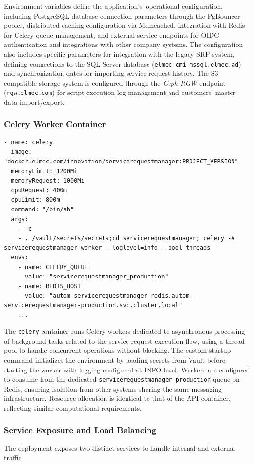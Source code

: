 Environment variables define the application's~operational configuration, including PostgreSQL database connection parameters through the PgBouncer pooler, distributed caching configuration via Memcached, integration with Redis for Celery queue management, and external service endpoints for OIDC authentication and integrations with other company systems.
The configuration also includes specific parameters for integration with the legacy SRP system, defining connections to the SQL Server database (\texttt{elmec-cmi-mssql.elmec.ad}) and synchronization dates for importing service request history. The S3-compatible storage system is configured through the \textit{Ceph RGW} endpoint (\texttt{rgw.elmec.com}) for script-execution log management and customers' master data import/export.

\subsubsection{Celery Worker Container}

\begin{verbatim}
- name: celery
  image: "docker.elmec.com/innovation/servicerequestmanager:PROJECT_VERSION"
  memoryLimit: 1200Mi
  memoryRequest: 1000Mi
  cpuRequest: 400m
  cpuLimit: 800m
  command: "/bin/sh"
  args:
    - -c
    - . /vault/secrets/secrets;cd servicerequestmanager; celery -A servicerequestmanager worker --loglevel=info --pool threads
  envs:
    - name: CELERY_QUEUE
      value: "servicerequestmanager_production"
    - name: REDIS_HOST
      value: "autom-servicerequestmanager-redis.autom-servicerequestmanager-production.svc.cluster.local"
    ...
\end{verbatim}
The \texttt{celery} container runs Celery workers dedicated to asynchronous processing of background tasks related to the service request execution flow, using a thread pool to handle concurrent operations without blocking. The custom startup command initializes the environment by loading secrets from Vault before starting the worker with logging configured at INFO level.
Workers are configured to consume from the dedicated \texttt{servicerequestmanager\_production} queue on Redis, ensuring isolation from other systems sharing the same messaging infrastructure. Resource allocation is identical to that of the API container, reflecting similar computational requirements.

\subsubsection{Service Exposure and Load Balancing}
The deployment exposes two distinct services to handle internal and external traffic.

